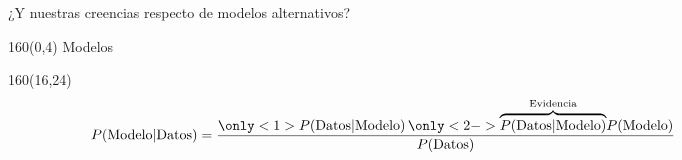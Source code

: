 \documentclass[shownotes,aspectratio=169]{beamer}
\begin{document}
\begin{frame}[plain]

\vspace{0.75cm}

 \begin{center}
 \Large ¿Y nuestras creencias respecto de modelos alternativos?  
 \end{center}

\end{frame}


\begin{frame}[plain]
\begin{textblock}{160}(0,4)
 \centering \Large Modelos \\
\end{textblock}

\begin{textblock}{160}(16,24) 
\begin{equation*}
 P(\text{Modelo}|\text{Datos}) = \frac{\only<1>{P(\text{Datos}|\text{Modelo})\,}\only<2->{\overbrace{P(\text{Datos}|\text{Modelo})}^{\text{Evidencia}}}P(\text{Modelo})}{ P(\text{Datos})} \phantom{\frac{\overbrace{P(\text{Datos}|\text{Modelo})}^{\text{Evidencia}}}{ P(\text{Datos})}}
\end{equation*}
\end{textblock}



\end{frame}
\end{document}
